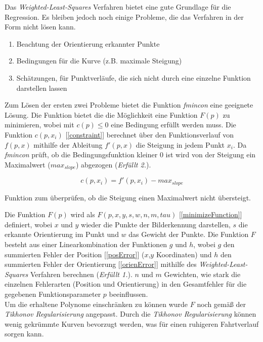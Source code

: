 Das \textit{Weighted-Least-Squares} Verfahren bietet eine gute Grundlage für die Regression. Es bleiben jedoch noch einige Probleme, die das Verfahren in der Form nicht lösen kann.
\begin{enumerate}
\item Beachtung der Orientierung erkannter Punkte
\item Bedingungen für die Kurve (z.B. maximale Steigung)
\item Schätzungen, für Punktverläufe, die sich nicht durch eine einzelne Funktion darstellen lassen
\end{enumerate}

Zum Lösen der ersten zwei Probleme bietet die \matlab Funktion \textit{fmincon} eine geeignete Lösung. Die Funktion bietet die die Möglichkeit eine Funktion $F(p)$ zu minimieren, wobei mit $c(p) \leq 0$ eine Bedingung erfüllt werden muss. Die Funktion $c(p,x_i)$ [\ref{constraint}] berechnet über den Funktionsverlauf von $f(p,x)$ mithilfe der Ableitung $f'(p,x)$ die Steigung in jedem Punkt $x_i$. Da \textit{fmincon} prüft, ob die Bedingungsfunktion kleiner 0 ist wird von der Steigung ein Maximalwert ($max_{slope}$) abgezogen (\textit{Erfüllt 2.}).\\
\begin{ownequation}[H]
\begin{equation}
c(p,x_i) = f'(p,x_i)-max_{slope}
\end{equation}
\caption{Funktion zum überprüfen, ob die Steigung einen Maximalwert nicht übersteigt.}
\label{constraint}
\end{ownequation}
Die Funktion $F(p)$ wird als $F(p,x,y,s,w,n,m,tau)$ [\ref{minimizeFunction}] definiert, wobei $x$ und $y$ wieder die Punkte der Bilderkennung darstellen, $s$ die erkannte Orientierung im Punkt und $w$ das Gewicht der Punkte. Die Funktion $F$ besteht aus einer Linearkombination der Funktionen $g$ und $h$, wobei $g$ den summierten Fehler der Position [\ref{posError}] ($x$,$y$ Koordinaten) und $h$ den summierten Fehler der Orientierung [\ref{orienError}] mithilfe des \textit{Weighted-Least-Squares} Verfahren berechnen (\textit{Erfüllt 1.}). $n$ und $m$ Gewichten, wie stark die einzelnen Fehlerarten (Position und Orientierung) in den Gesamtfehler für die gegebenen Funktionsparameter $p$ beeinflussen.\\
Um die erhaltene Polynome einschränken zu können wurde $F$ noch gemäß der \textit{Tikhonov Regularisierung} \cite{kaipio2006statistical} angepasst. Durch die \textit{Tikhonov Regularisierung} können wenig gekrümmte Kurven bevorzugt werden, was für einen ruhigeren Fahrtverlauf sorgen kann.

